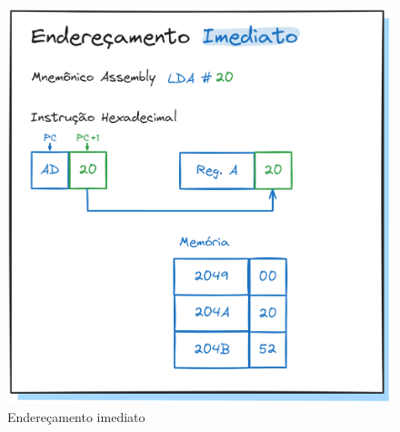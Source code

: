 \documentclass[
	12pt,				  %
	openright,		%
	a4paper,			%
	english,			%
	french,				%
	spanish,			%
	brazil,				%
]{abntex2}
\begin{document}
\begin{figure}[h]
	\centering
	\caption{Endereçamento imediato} \label{fig:address:imm}
	\includegraphics[scale=0.25]{../assets/img/addressing-modes-imm.png}
\end{figure}
\end{document}
